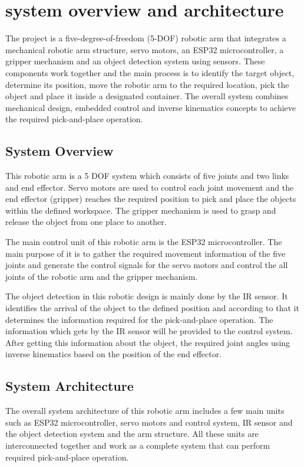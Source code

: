 \section{system overview and architecture}

The project is a five-degree-of-freedom (5-DOF) robotic arm that integrates a mechanical robotic arm structure, servo motors, an ESP32 microcontroller, a gripper mechanism and an object detection system using sensors. These components work together and the main process  is to identify the target object, determine its position, move the robotic arm to the required location, pick the object and place it inside a designated container. The overall system combines mechanical design, embedded control and inverse kinematics concepts to achieve the required pick-and-place operation. 

\subsection{System Overview}

This robotic arm is a 5 DOF system which consists of five joints and two links and end effector.  Servo motors are used to control each joint movement and the end effector (gripper) reaches the required position to pick and place the objects within the defined workspace. The gripper mechanism is used to grasp and release the object from one place to another.

The main control unit of this robotic arm is the ESP32 microcontroller. The main purpose of it is to gather the required movement information  of the five joints and generate the control signals for the servo motors and control the all joints of the robotic arm and the gripper mechanism.  
 
The object detection in this robotic design is mainly done by the IR sensor. It identifies the arrival of the object to the defined position and  according to that it determines the information required for the pick-and-place operation. The information which gets by the IR sensor will be provided to the control system. After getting this information about the object, the required joint angles using inverse kinematics based on the position of the end effector. 

\subsection{System Architecture}

The overall system architecture of this robotic arm includes a few main units such as ESP32 microcontroller, servo motors and control system, IR sensor and the object detection system and the arm structure. All these units are interconnected together and work as a complete system that can perform required pick-and-place operation. 


